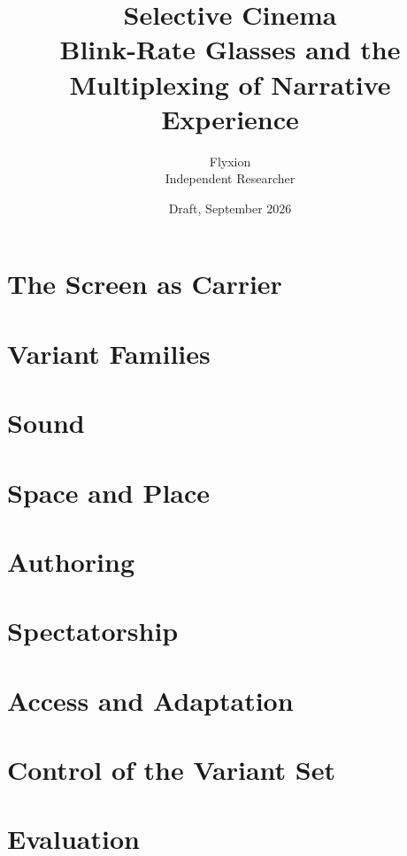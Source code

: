\documentclass[11pt,openany]{book}
\title{\textbf{Selective Cinema}\\[0.6em]
\Large Blink-Rate Glasses and the Multiplexing of Narrative Experience}
\author{Flyxion\\[0.3em]\normalsize Independent Researcher}
\date{Draft, September 2026}
\theoremstyle{definition}
\theoremstyle{remark}
\begin{document}
\frontmatter
\maketitle
\tableofcontents


\mainmatter


\part{The Screen as Carrier}





\part{Variant Families}







\part{Sound}


\part{Space and Place}



\part{Authoring}




\part{Spectatorship}




\part{Access and Adaptation}



\part{Control of the Variant Set}





\part{Evaluation}




\appendix


\backmatter

\end{document}
